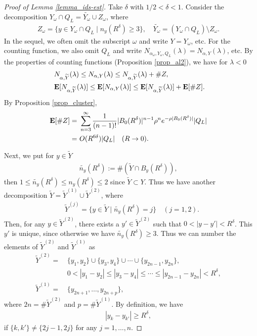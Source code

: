 \documentclass[12pt,a4paper]{article}
\begin{document}
 \begin{proof}[Proof of Lemma \ref{lemma_ids-est}]
  Take $\delta$ with $1/2<\delta <1$.
Consider the decomposition
$Y_\omega \cap Q_L = \widetilde{Y_\omega}\cup Z_\omega$, where
\begin{align*}
 Z_\omega = \{ y \in Y_\omega \cap Q_L\mid n_y(R^\delta)\geq 3\},\quad
\widetilde{Y_\omega} = (Y_\omega \cap Q_L)\setminus Z_\omega.
\end{align*}
In the sequel, we often omit the subscript $\omega$ and
write $Y=Y_\omega$, etc.
For the counting function,
we also omit $Q_L$ and write
$N_{\alpha_\omega,Y_\omega, Q_L}(\lambda)
=
N_{\alpha,Y}(\lambda)
$, etc.
By the properties of counting functions
(Proposition \ref{prop_al2}),
we have for $\lambda <0$
\begin{align}
&\ 
 N_{\alpha,\widetilde{Y}}(\lambda)
\leq
 N_{\alpha,Y}(\lambda)
\leq
 N_{\alpha,\widetilde{Y}}(\lambda)
+\# Z,\notag\\
&\ 
\mathbf{E}[
N_{\alpha,\widetilde{Y}}(\lambda)
] 
\leq
\mathbf{E}[
 N_{\alpha,Y}(\lambda)
] 
\leq
\mathbf{E}[
 N_{\alpha,\widetilde{Y}}(\lambda)
] 
+
\mathbf{E}[
\# Z
].
\label{04_07}
\end{align}
By Proposition \ref{prop_cluster}, 
\begin{align}
 \mathbf{E}[\# Z]
=&\ 
\sum_{n=3}^\infty
\frac{1}{(n-1)!}|B_0(R^\delta)|^{n-1}\rho^n e^{-\rho|B_0(R^\delta)|}|Q_L|\notag\\
=&\ 
O(R^{6\delta})|Q_L|\quad (R\to 0).
\label{04_08}
\end{align}

Next, we put for $y\in \widetilde{Y}$
\begin{align*}
\widetilde{n_y}(R^\delta)
:=
\#(\widetilde{Y}\cap B_y(R^\delta)), 
\end{align*}
then $1\leq \widetilde{n_y}(R^\delta)\leq n_y(R^\delta)\leq 2$
since $\widetilde{Y}\subset Y$.
Thus we have another decomposition
$\widetilde{Y}=\widetilde{Y}^{(1)}\cup \widetilde{Y}^{(2)}$, where
\begin{align*}
&\ 
 \widetilde{Y}^{(j)}
=
\{y\in \widetilde{Y}\mid \widetilde{n_y}(R^\delta)=j\}\quad (j=1,2).
\end{align*}
Then, for any $y \in \widetilde{Y}^{(2)}$, there exists a 
$y'\in \widetilde{Y}^{(2)}$ such that 
$0<|y-y'|<R^\delta$.
This $y'$ is unique, since otherwise we have $\widetilde{n_y}(R^\delta)\geq 3$.
Thus we can number the elements of $\widetilde{Y}^{(2)}$ and 
$\widetilde{Y}^{(1)}$ as
\begin{align*}
  \widetilde{Y}^{(2)}
=&\
\{y_1,y_2\}
\cup
\{y_3,y_4\}
\cup
\cdots
\cup
\{y_{2n-1},y_{2n}\},\\
&\ 
0<|y_1-y_2|\leq |y_3-y_4|\leq\cdots \leq |y_{2n-1}-y_{2n}|<R^\delta,\\
\widetilde{Y}^{(1)}=&\ \{y_{2n+1},\ldots, y_{2n+p}\},
\end{align*}
where $2n=\# \widetilde{Y}^{(2)}$ and $p=\# \widetilde{Y}^{(1)}$.
By definition, we have
\begin{align*}
 |y_k-y_{k'}|\geq R^\delta,
\end{align*}
if $\{k,k'\}\not=\{2j-1,2j\}$  for any $j=1,\ldots,n$.
  

\end{proof}
\end{document}
